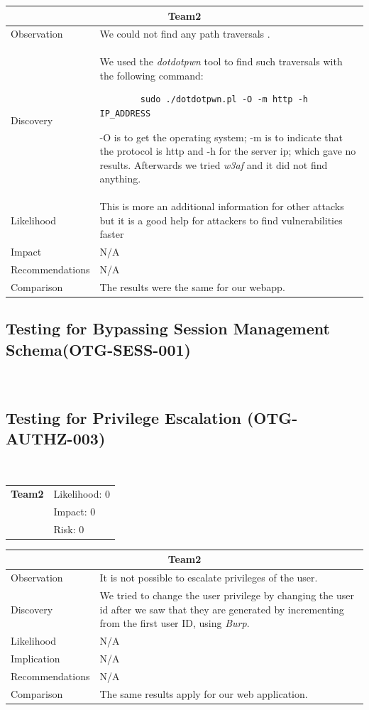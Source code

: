 \documentclass[headsepline,footsepline,footinclude=false,oneside,fontsize=11pt,paper=a4,listof=totoc,bibliography=totoc]{scrbook} %
\begin{document}
\begin{tabular}{ l|p{11cm}  }
	\hline
	\multicolumn{2}{c}{\textbf{Team2}} \\
	\hline
	Observation   & We could not find any path traversals .\\
	Discovery  & We used the \textit{dotdotpwn} tool to find such traversals with the following command:
	\begin{lstlisting}
		sudo ./dotdotpwn.pl -O -m http -h IP_ADDRESS 
	\end{lstlisting}
	-O is to get the operating system;  
	-m is to indicate that the protocol is http and -h for the server ip;  
	which gave no results.
	Afterwards we tried \textit{w3af} and it did not find anything.\\
	Likelihood & This is more an additional information for other attacks but it is a
	good help for attackers to find vulnerabilities faster \\
	Impact    & N/A \\
	Recommendations & N/A \\
	Comparison & The results were the same for our webapp.\\
	\hline
\end{tabular}  
 

\pagebreak
\subsection{Testing for Bypassing Session Management Schema(OTG-SESS-001)}\

\pagebreak

\subsection{Testing for Privilege Escalation (OTG-AUTHZ-003)}\

\begin{tabular}{cR{12cm}}
	\textbf{Team2} & Likelihood: 0\\& Impact: 0\\& Risk: 0
\end{tabular}

\begin{tabular}{ l|p{11cm}  }
	\hline
	\multicolumn{2}{c}{\textbf{Team2}} \\
	\hline
	Observation   & It is not possible to escalate privileges of the user.  \\
	Discovery  & We tried to change the user privilege by changing the user id after we saw that they are generated by incrementing from the first user ID, using \textit{Burp}.\\
	Likelihood & N/A \\
	Implication    & N/A \\
	Recommendations & N/A \\
	Comparison & The same results apply for our web application.\\
	\hline
\end{tabular}
\pagebreak
\end{document}

